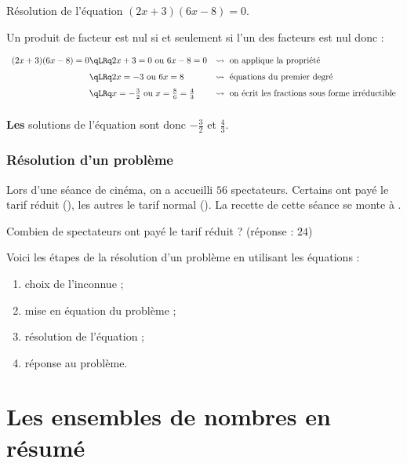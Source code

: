 \documentclass[10pt,openright,twoside,french]{book}
\begin{document}
\begin{Exemple}
    Résolution de l'équation $(2x + 3)(6x - 8) = 0$.\par\smallskip

    Un produit de facteur est nul si et seulement si l'un des facteurs est nul donc :\smallskip

    \hspace{-1cm}$\begin{array}{r@{\qLRq}ll}
        (2x + 3)(6x - 8) = 0 & 2x+3 = 0 \text{ ou } 6x - 8 = 0 & \rightsquigarrow\ \text{on applique la propriété} \\[7pt]
         &   2x = -3 \text{ ou } 6x = 8 &\rightsquigarrow\ \text{équations du premier degré} \\[7pt]
        & x = -\frac 3 2 \text{ ou } x = \frac 8 6 = \frac 43 & \rightsquigarrow\ \text{on écrit les fractions sous forme irréductible} \\[7pt]
    \end{array}$

    \textbf{Les} solutions de l'équation sont donc $-\frac 3 2$ et $\frac 43$.
\end{Exemple}

\subsubsection{Résolution d'un problème}
\begin{Exemple}
    Lors d'une séance de cinéma, on a accueilli $56$ spectateurs. Certains ont payé le tarif réduit (), les autres le tarif normal (). La recette de cette séance se monte à .\par Combien de spectateurs ont payé le tarif réduit ? (réponse : $24$)
\end{Exemple}

Voici les étapes de la résolution d'un problème en utilisant les équations :
\begin{enumerate}
    \item choix de l'inconnue ;
    \item mise en équation du problème ;
    \item résolution de l'équation ;
    \item réponse au problème.
\end{enumerate}\medskip


\section{Les ensembles de nombres en résumé}
\end{document}

